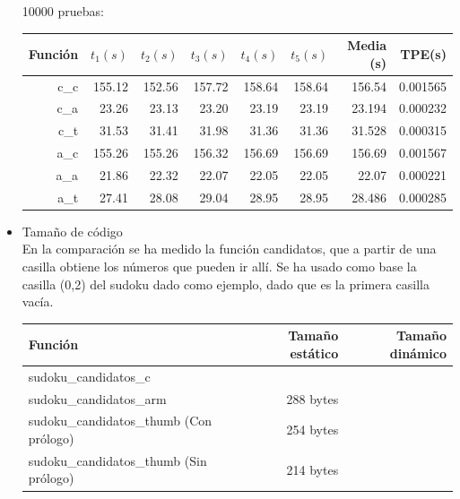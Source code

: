 \documentclass[12pt,letterpaper]{article}
\begin{document}
\begin{itemize}
  10000 pruebas:\\
  \begin{center}
    \begin{tabular}{ r | r | r | r | r | r | r | r }
      Funci\'on & $t_1 (s)$ & $t_2 (s)$ & $t_3 (s)$ & $t_4 (s)$ & $t_5 (s)$ & Media (s) & TPE\footnotemark[1] (s) \\ \hline
      c\_c    & 155.12 & 152.56 & 157.72 & 158.64 & 158.64 & 156.54 & 0.001565 \\
      c\_a    & 23.26  & 23.13  & 23.20  & 23.19  & 23.19  & 23.194 & 0.000232 \\
      c\_t    & 31.53  & 31.41  & 31.98  & 31.36  & 31.36  & 31.528 & 0.000315 \\ \hline
      a\_c    & 155.26 & 155.26 & 156.32 & 156.69 & 156.69 & 156.69 & 0.001567 \\
      a\_a    & 21.86  & 22.32  & 22.07  & 22.05  & 22.05  & 22.07  & 0.000221 \\
      a\_t    & 27.41  & 28.08  & 29.04  & 28.95  & 28.95  & 28.486 & 0.000285 \\ \hline
    \end{tabular}
  \end{center}
  \clearpage
\item {\large Tamaño de c\'odigo}\\
  En la comparaci\'on se ha medido la funci\'on candidatos, que a partir
  de una casilla obtiene los n\'umeros que pueden ir all\'i. Se ha usado
  como base la casilla (0,2) del sudoku dado como ejemplo, dado que es
  la primera casilla vac\'ia.
  \begin{center}
    \begin{tabular}{ l | r | r }
      Funci\'on                                 & Tamaño est\'atico & Tamaño din\'amico \\ \hline
      sudoku\_candidatos\_c                   &                 &                 \\
      sudoku\_candidatos\_arm                 & 288 bytes       &                 \\
      sudoku\_candidatos\_thumb (Con pr\'ologo) & 254 bytes       &                 \\
      sudoku\_candidatos\_thumb (Sin pr\'ologo) & 214 bytes       &                 \\ \hline
    \end{tabular}
  \end{center}
\end{itemize}
\end{document}
